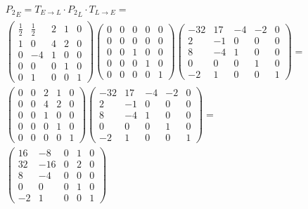 \documentclass[12pt, a4paper]{article}
\begin{document}
    \begin{multline}
        {P_2}_E = T_{E \to L} \cdot {P_2}_L \cdot T_{L \to E} = \\
        \left(\begin{matrix}
            \frac{1}{2} & \frac{1}{2} & 2 & 1 & 0 \\
            1 & 0 & 4 & 2 & 0 \\
            0 & -4 & 1 & 0 & 0 \\
            0 & 0 & 0 & 1 & 0 \\
            0 & 1 & 0 & 0 & 1
        \end{matrix}\right) \left(\begin{matrix}
            0 & 0 & 0 & 0 & 0 \\
            0 & 0 & 0 & 0 & 0 \\
            0 & 0 & 1 & 0 & 0 \\
            0 & 0 & 0 & 1 & 0 \\
            0 & 0 & 0 & 0 & 1
        \end{matrix}\right) \left(\begin{matrix}
            -32 & 17 & -4 & -2 & 0 \\
            2 & -1 & 0 & 0 & 0 \\
            8 & -4 & 1 & 0 & 0 \\
            0 & 0 & 0 & 1 & 0 \\
            -2 & 1 & 0 & 0 & 1
        \end{matrix}\right) = \\
        \left(\begin{matrix}
            0 & 0 & 2 & 1 & 0 \\
            0 & 0 & 4 & 2 & 0 \\
            0 & 0 & 1 & 0 & 0 \\
            0 & 0 & 0 & 1 & 0 \\
            0 & 0 & 0 & 0 & 1
        \end{matrix}\right) \left(\begin{matrix}
            -32 & 17 & -4 & -2 & 0 \\
            2 & -1 & 0 & 0 & 0 \\
            8 & -4 & 1 & 0 & 0 \\
            0 & 0 & 0 & 1 & 0 \\
            -2 & 1 & 0 & 0 & 1
        \end{matrix}\right) = \\
        \left(\begin{matrix}
            16 & -8 & 0 & 1 & 0 \\
            32 & -16 & 0 & 2 & 0 \\
            8 & -4 & 0 & 0 & 0 \\
            0 & 0 & 0 & 1 & 0 \\
            -2 & 1 & 0 & 0 & 1
        \end{matrix}\right)
    \end{multline}
\end{document}
